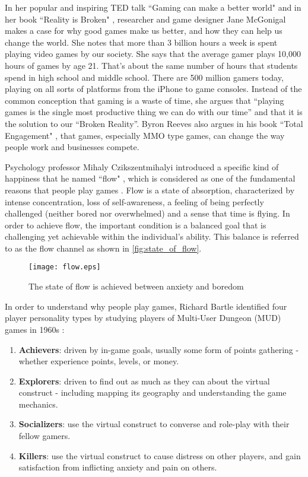 In her popular and inspiring TED talk ``Gaming can make a better world" \cite {mcgonigal2010ted} and in her book ``Reality is Broken" \cite {mcgonigal2011reality}, researcher and game designer Jane McGonigal makes a case for why good games make us better, and how they can help us change the world. She notes that more than 3 billion hours a week is spent playing video games by our society. She says that the average gamer plays 10,000 hours of games by age 21. That's about the same number of hours that students spend in high school and middle school. There are 500 million gamers today, playing on all sorts of platforms from the iPhone to game consoles. Instead of the common conception that gaming is a waste of time, she argues that ``playing games is the single most productive thing we can do with our time'' and that it is  the solution to our ``Broken Reality''. Byron Reeves also argues in his book ``Total Engagement" \cite {reeves2009total}, that games, especially MMO type games, can change the way people work and businesses compete.

Psychology professor Mihaly Czikszentmihalyi introduced a specific kind of happiness that he named ``flow" \cite{csikszentmihalyi1991flow}, which is considered as one of the fundamental reasons that people play games \cite{murphygames}. Flow is a state of absorption, characterized by intense concentration, loss of self-awareness, a feeling of being perfectly challenged (neither bored nor overwhelmed) and a sense that time is flying. In order to achieve flow, the important condition is a balanced goal that is challenging yet achievable within the individual's ability. This balance is referred to as the flow channel as shown in \autoref{fig:state_of_flow}.

\begin{figure}[ht!]
	\centering
		\texttt{[image: flow.eps]}
		\caption{The state of flow is achieved between anxiety and boredom \cite{csikszentmihalyi1991flow}}
		\label{fig:state_of_flow}
\end{figure}

In order to understand why people play games, Richard Bartle identified four player personality types by studying players of Multi-User Dungeon (MUD) games in 1960s \cite {bartle1996hearts}:
\begin{enumerate}
\item \textbf{Achievers}: driven by in-game goals, usually some form of points gathering - whether experience points, levels, or money.
\item \textbf{Explorers}:  driven to find out as much as they can about the virtual construct - including mapping its geography and understanding the game mechanics.
\item \textbf{Socializers}: use the virtual construct to converse and role-play with their fellow gamers.
\item \textbf{Killers}: use the virtual construct to cause distress on other players, and gain satisfaction from inflicting anxiety and pain on others.
\end{enumerate}

